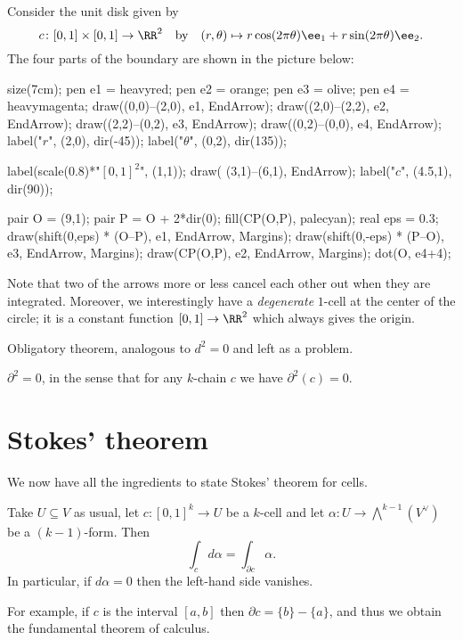 \begin{example}
	Consider the unit disk given by
	\[ c \colon [0,1] \times [0,1] \to \RR^2 \quad\text{by}\quad
	(r,\theta) \mapsto r\cos(2\pi \theta)\ee_1 + r\sin(2\pi \theta)\ee_2. \]
	The four parts of the boundary are shown in the picture below:
	\begin{center}
		\begin{asy}
			size(7cm);
			pen e1 = heavyred;
			pen e2 = orange;
			pen e3 = olive;
			pen e4 = heavymagenta;
			draw((0,0)--(2,0), e1, EndArrow);
			draw((2,0)--(2,2), e2, EndArrow);
			draw((2,2)--(0,2), e3, EndArrow);
			draw((0,2)--(0,0), e4, EndArrow);
			label("$r$", (2,0), dir(-45));
			label("$\theta$", (0,2), dir(135));

			label(scale(0.8)*"$[0,1]^2$", (1,1));
			draw( (3,1)--(6,1), EndArrow);
			label("$c$", (4.5,1), dir(90));

			pair O = (9,1);
			pair P = O + 2*dir(0);
			fill(CP(O,P), palecyan);
			real eps = 0.3;
			draw(shift(0,eps) * (O--P), e1, EndArrow, Margins);
			draw(shift(0,-eps) * (P--O), e3, EndArrow, Margins);
			draw(CP(O,P), e2, EndArrow, Margins);
			dot(O, e4+4);
		\end{asy}
	\end{center}
	Note that two of the arrows more or less cancel each other out when they are integrated.
	Moreover, we interestingly have a \emph{degenerate} $1$-cell at the center of the circle;
	it is a constant function $[0,1] \to \RR^2$ which always gives the origin.
\end{example}

Obligatory theorem, analogous to $d^2=0$ and left as a problem.
\begin{theorem}
	$\partial^2 = 0$, in the sense that for any $k$-chain $c$ we have $\partial^2(c) = 0$.
\end{theorem}

\section{Stokes' theorem}

We now have all the ingredients to state Stokes' theorem for cells.
\begin{theorem}
	Take $U \subseteq V$ as usual, let $c \colon [0,1]^k \to U$ be a $k$-cell
	and let $\alpha \colon U \to \bigwedge^{k-1}(V^\vee)$ be a $(k-1)$-form.
	Then
	\[ \int_c d\alpha = \int_{\partial c} \alpha. \]
	In particular, if $d\alpha = 0$ then the left-hand side vanishes.
\end{theorem}
For example, if $c$ is the interval $[a,b]$ then $\partial c = \{b\} - \{a\}$,
and thus we obtain the fundamental theorem of calculus.

